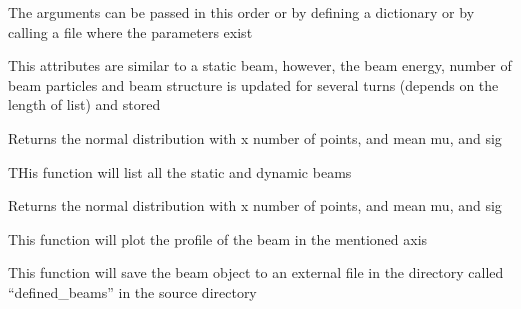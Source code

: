 \documentclass[letterpaper,10pt,english]{sphinxmanual}
\begin{document}
The arguments can be passed in this order or by defining a dictionary or by calling a file where the parameters exist

\begin{fulllineitems}
\label{beam:beam.dynamicbeam}
This attributes are similar to a static beam, however, the beam energy, number of beam particles and beam structure is updated for several turns (depends on the length of list) and stored

\begin{fulllineitems}
\label{beam:beam.dynamicbeam.gaussian}
Returns the normal distribution with x number of points, and mean mu, and sig

\end{fulllineitems}


\begin{fulllineitems}
\label{beam:beam.dynamicbeam.listfiles}
THis function will list all the static and dynamic beams

\end{fulllineitems}


\begin{fulllineitems}
\label{beam:beam.dynamicbeam.parabolic}
Returns the normal distribution with x number of points, and mean mu, and sig

\end{fulllineitems}


\begin{fulllineitems}
\label{beam:beam.dynamicbeam.plot}
This function will plot the profile of the beam in the mentioned axis

\end{fulllineitems}


\begin{fulllineitems}
\label{beam:beam.dynamicbeam.save}
This function will save the beam object to an external file in the directory called ``defined\_beams'' in the source directory


\end{fulllineitems}
\end{fulllineitems}
\end{document}

